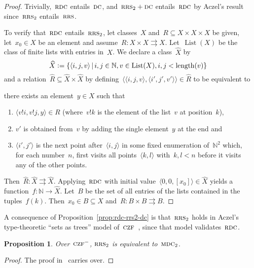 \documentclass[oneside,reqno]{amsart}
\theoremstyle{definition}
\theoremstyle{plain}
\newtheorem{prop}[defn]{Proposition}
\theoremstyle{remark}
\newenvironment{indentblock}{%
  \list{}{\leftmargin\leftmargin}%
  \item\relax
}{%
  \endlist
}
\newcommand{\NN}{\mathbb{N}}
\newcommand{\defeq}{\vcentcolon=}
\DeclareMathOperator{\length}{length}
\DeclareMathOperator{\List}{List}
\renewcommand{\_}{\mathpunct{.}\,}
\newcommand{\?}{\,{:}\,}
\newcommand{\CZF}{\textsc{czf}}
\newcommand{\RRS}{\textsc{rrs}}
\newcommand{\RDC}{\textsc{rdc}}
\newcommand{\DC}{\textsc{dc}}
\newcommand{\MDC}{\textsc{mdc}}
\begin{document}
\begin{proof}Trivially,~$\RDC$ entails~$\DC$, and~$\RRS_2 + \DC$
entails~$\RDC$ by Aczel's result since~$\RRS_2$ entails~$\RRS$.

To verify that~$\RDC$ entails~$\RRS_2$, let classes~$X$ and~$R \subseteq X
\times X \times X$ be given, let~$x_0 \in X$ be an element and assume~$R : X
\times X \rightrightarrows X$. Let~$\List(X)$ be the class of finite lists with
entries in~$X$. We declare a class~$\widehat X$ by
\[ \widehat X \defeq \{ \langle i,j,v \rangle \,|\, i,j \in
\NN, v \in \List(X), i,j < \length(v) \} \]
and a relation~$\widehat R \subseteq \widehat X \times \widehat X$ by
defining~$\langle \langle i,j,v \rangle, \langle i',j',v' \rangle \rangle \in
\widehat R$ to be equivalent to
\begin{indentblock}
there exists an element~$y \in X$ such that
\begin{enumerate}
\item $\langle v!i, v!j, y \rangle \in R$ (where~$v!k$ is the element of the
list~$v$ at position~$k$),
\item $v'$ is obtained from~$v$ by adding the single element~$y$ at the end and
\item $\langle i',j' \rangle$ is the next point after~$\langle i,j
\rangle$ in some fixed enumeration of~$\NN^2$ which, for each number~$n$, first visits
all points~$\langle k,l \rangle$ with~$k,l < n$ before it visits any of
the other points.
\end{enumerate}
\end{indentblock}
Then~$\widehat R : \widehat X \rightrightarrows \widehat X$. Applying~$\RDC$
with initial value~$\langle 0,0, [x_0] \rangle \in \widehat X$ yields a
function~$f : \NN \to \widehat X$. Let~$B$ be the set of all
entries of the lists contained in the tuples~$f(k)$. Then~$x_0 \in B
\subseteq X$ and~$R : B \times B \rightrightarrows B$.
\end{proof}

A consequence of Proposition~\ref{prop:rdc-rrs2-dc} is that~$\RRS_2$ holds in
Aczel's type-theoretic ``sets as trees'' model
of~$\CZF$~\cite{aczel:sets-as-trees}, since that model validates~$\RDC$.

\begin{prop}Over~$\CZF^-$, $\RRS_2$ is equivalent to~$\MDC_2$.\end{prop}

\begin{proof}The proof in~\cite{palmgren:mdc} carries over.\end{proof}
\end{document}

